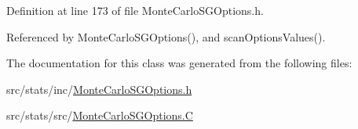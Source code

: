 Definition at line 173 of file Monte\-Carlo\-S\-G\-Options.\-h.



Referenced by Monte\-Carlo\-S\-G\-Options(), and scan\-Options\-Values().



The documentation for this class was generated from the following files\-:\begin{DoxyCompactItemize}
\item 
src/stats/inc/\hyperlink{_monte_carlo_s_g_options_8h}{Monte\-Carlo\-S\-G\-Options.\-h}\item 
src/stats/src/\hyperlink{_monte_carlo_s_g_options_8_c}{Monte\-Carlo\-S\-G\-Options.\-C}\end{DoxyCompactItemize}
